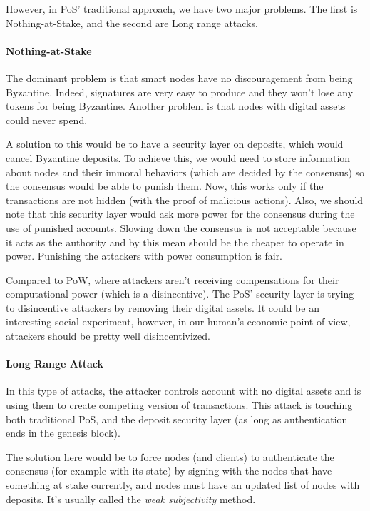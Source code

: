 However, in PoS' traditional approach, we have two major problems. The first is Nothing-at-Stake, and the second are Long range attacks.

\paragraph{Nothing-at-Stake}
The dominant problem is that smart nodes have no discouragement from being Byzantine\cite{Lamport1982TheProblem}. Indeed, signatures are very easy to produce and they won't lose any tokens for being Byzantine. Another problem is that nodes with digital assets could never spend.

A solution to this would be to have a security layer on deposits, which would cancel Byzantine deposits. To achieve this, we would need to store information about nodes and their immoral behaviors (which are decided by the consensus) so the consensus would be able to punish them. Now, this works only if the transactions are not hidden (with the proof of malicious actions). Also, we should note that this security layer would ask more power for the consensus during the use of punished accounts. Slowing down the consensus is not acceptable because it acts as the authority and by this mean should be the cheaper to operate in power. Punishing the attackers with power consumption is fair.

Compared to PoW, where attackers aren't receiving compensations for their computational power (which is a disincentive). The PoS' security layer is trying to disincentive attackers by removing their digital assets. It could be an interesting social experiment, however, in our human's economic point of view, attackers should be pretty well disincentivized.  

\paragraph{Long Range Attack}
In this type of attacks, the attacker controls account with no digital assets and is using them to create competing version of transactions. This attack is touching both traditional PoS, and the deposit security layer (as long as authentication ends in the genesis block).

The solution here would be to force nodes (and clients) to authenticate the consensus (for example with its state) by signing with the nodes that have something at stake currently, and nodes must have an updated list of nodes with deposits. It's usually called the \textit{weak subjectivity} method.

